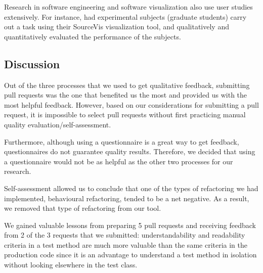 Research in software engineering and software visualization also use
user studies extensively.  For instance,  had
experimental subjects (graduate students) carry out a task using their
SourceVis visualization tool, and qualitatively and quantitatively
evaluated the performance of the subjects.


\subsection{Discussion}
Out of the three processes that we used to get qualitative feedback, submitting pull requests was the one that benefited us the most and provided us with the most helpful feedback. However, based on our considerations for submitting a pull request, it is impossible to select pull requests without first practicing manual quality evaluation/self-assessment.

Furthermore, although using a questionnaire is a great way to get feedback, questionnaires do not guarantee quality results. Therefore, we decided that using a questionnaire would not be as helpful as the other two processes for our research.

Self-assessment allowed us to conclude that one of the types of refactoring we had implemented, behavioural refactoring, tended to be a net negative. As a result, we removed that type of refactoring from our tool.

We gained valuable lessons from preparing 5 pull requests and receiving feedback from 2 of the 3 requests that we submitted: understandability and readability criteria in a test method are much more valuable than the same criteria in the production code since it is an advantage to understand a test method in isolation without looking elsewhere in the test class. 




